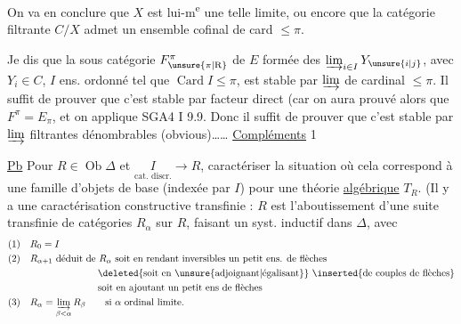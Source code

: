 
On va en conclure que  $X$ est  lui-m\textsuperscript{e} une telle limite, ou encore que la catégorie filtrante $C/X$ admet un ensemble cofinal de card $\leq\pi$. 

Je dis que la  sous catégorie $F^\pi_{\unsure{\pi|\mathrm R}}$ de $E$ formée des $\varinjlim_{i\in I} Y_{\unsure{i|j}}$, avec $Y_i\in C$, $I$ ens. ordonné tel que $\operatorname{Card} I\leq\pi$, est stable par $\varinjlim$ de cardinal $\leq\pi$. Il suffit de prouver que c'est stable par facteur direct (car on aura prouvé alors que $F^\pi=E_\pi$, et on applique SGA4 I 9.9. Donc il suffit de prouver que c'est stable par $\varinjlim$ filtrantes dénombrables (obvious)\ldots\ldots
\uline{Compléments}
\textcircled{1}

\uline{Pb} Pour $R\in\operatorname{Ob}\Delta$ et $\underset{\text{cat. discr.}}I\longrightarrow R$, caractériser la situation où cela correspond à une famille d'objets de base (indexée par $I$) pour une théorie \uline{algébrique} $T_R$. (Il y a une caractérisation constructive transfinie : $R$ est l'aboutissement d'une suite transfinie de catégories $R_\alpha$ sur $R$, faisant un  syst. inductif  dans $\Delta$, avec
\[
 \begin{aligned}
 (1)\quad &R_0=I\\
 (2)\quad &R_{\alpha+1}\ \text{déduit de $R_\alpha$ soit en rendant inversibles un petit ens. de flèches}\\
 &\hspace{7em}\text{\deleted{soit en \unsure{adjoignant|égalisant}} \inserted{de couples de flèches}}\\
 &\hspace{7em}\text{soit en ajoutant un petit ens de flèches}\\
 (3)\quad &R_\alpha=\varinjlim_{\beta<\alpha} R_\beta\qquad\text{si $\alpha$ ordinal limite.}
 \end{aligned}
\]


